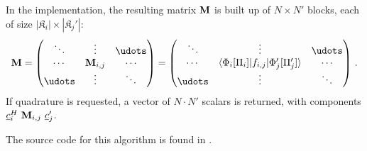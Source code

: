 In the implementation, the resulting matrix $\mathbf{M}$ is built up of $N \times
N'$ blocks, each of size $|\mathfrak{K}_i| \times |\mathfrak{K}_j'|$:
\begin{equation}
  \mat{M} = \begin{pmatrix} \ddots & \vdots & \udots \\
    \cdots & \mat{M}_{i,j} & \cdots \\
    \udots & \vdots & \ddots
  \end{pmatrix} =
  \begin{pmatrix} \ddots & \vdots & \udots \\
    \cdots & \langle \Phi_i[\Pi_i]|f_{i,j}|\Phi'_j[\Pi_j'] \rangle & \cdots \\
    \udots & \vdots & \ddots
  \end{pmatrix} \,.
\end{equation}
If quadrature is requested, a vector of $N \cdot N'$ scalars is returned, with
components $\vect{c}_i^H \ \mat{M}_{i,j} \ \vect{c}'_j$.

The source code for this algorithm is found in
.
